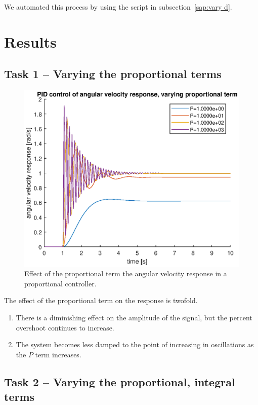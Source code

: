 \documentclass[12pt]{article}
\begin{document}
We automated this process by using the script in  subsection~\ref{sap:vary d}.

\section{Results}

\subsection{Task 1 -- Varying the proportional terms}

\begin{figure}
    \centering
    \includegraphics[width=\linewidth]{img/task01_varying_p.eps}
    \caption{Effect of the proportional term the angular velocity response in a proportional controller.}
    \label{fig:p on angular velocity}
\end{figure}

The effect of the proportional term on the response is twofold.
\begin{enumerate}
    \item There is a diminishing effect on the amplitude of the signal, but the percent overshoot continues to increase.
    \item The system becomes less damped to the point of increasing in oscillations as the $P$ term increases.
\end{enumerate}

\subsection{Task 2 -- Varying the proportional, integral terms}
\end{document}
